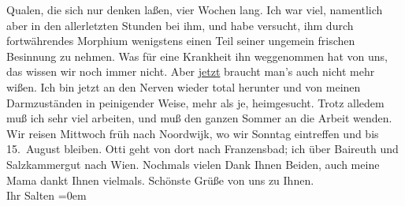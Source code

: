 \begin{ledgroupsized}[t]{13cm}
               Qualen, die sich nur denken laßen, vier Wochen lang. Ich war viel, namentlich aber in
               den allerletzten Stunden bei ihm, und habe versucht, ihm durch fortwährendes Morphium
               wenigstens einen Teil seiner ungemein frischen Besinnung zu nehmen. Was für eine
               Krankheit ihn weggenommen hat von uns, das wissen wir noch immer nicht. Aber \uline{jetzt} braucht man’s auch nicht mehr wißen. Ich bin
               jetzt an den Nerven wieder total herunter und von meinen Darmzuständen in peinigender
               Weise, mehr als je, heimgesucht. Trotz alledem muß ich sehr viel arbeiten, und muß
               den ganzen Sommer an die Arbeit wenden. Wir reisen Mittwoch{ }früh nach Noordwijk, wo wir Sonntag eintreffen und bis 15. August bleiben. Otti geht von
               dort nach Franzensbad; ich über Baireuth und Salzkammergut
               nach Wien.\pend
           \pstart
           Nochmals vielen Dank Ihnen Beiden, auch meine Mama dankt Ihnen vielmals. Schönste Grüße von uns zu Ihnen. {\\[\baselineskip]}Ihr
                  \spacefill\mbox{Salten}\pend
           \leftskip=0em{}
         
         \endnumbering{}\end{ledgroupsized}  \newcommand{\dateiname}{L03497}\newcommand{\titel}{Felix Salten an Arthur Schnitzler, 5. 7. 1908}\newcommand{\editorInnen}{Martin Anton Müller und Laura Untner}
      
